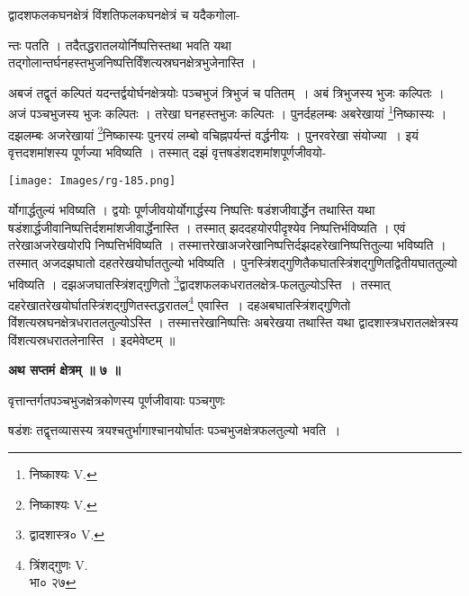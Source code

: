 \documentclass[11pt, openany]{book}
\begin{document}
{\ab द्वादशफलकघनक्षेत्रं विंशतिफलकघनक्षेत्रं च यदैकगोला- }


\newpage
{\ab न्तः पतति । तदैतद्धरातलयोर्निष्पत्तिस्तथा भवति यथा तद्गोलान्तर्घनहस्तभुजनिष्पत्तिर्विंशत्यस्रघनक्षेत्रभुजेनास्ति । }\\
\vspace{5mm}


अबजं तद्वृतं कल्पितं यदन्तर्द्वयोर्घनक्षेत्रयोः पञ्चभुजं त्रिभुजं च पतितम्~। अबं त्रिभुजस्य भुजः कल्पितः । अजं पञ्चभुजस्य भुजः कल्पितः । तरेखा घनहस्तभुजः कल्पितः । पुनर्दहलम्बः अबरेखायां \renewcommand{\thefootnote}{१}\footnote{निष्काश्यः {\en V.}}निष्कास्यः । दझलम्बः अजरेखायां \renewcommand{\thefootnote}{२}\footnote{निष्काश्यः {\en V.}}निष्कास्यः पुनरयं लम्बो वचिह्नपर्यन्तं वर्द्धनीयः । पुनरवरेखा संयोज्या~। इयं वृत्तदशमांशस्य पूर्णज्या भविष्यति । तस्मात् दझं वृत्तषडंशदशमांशपूर्णजीवयो-
\begin{center}
\texttt{[image: Images/rg-185.png]}  
\end{center}
र्योगार्द्धतुल्यं भविष्यति । द्वयोः पूर्णजीवयोर्योगार्द्धस्य निष्पत्तिः षडंशजीवार्द्धेन तथास्ति यथा षडंशार्द्धजीवानिष्पत्तिर्दशमांशजीवार्द्धेनास्ति । तस्मात्
झददहयोरपीदृश्येव निष्पत्तिर्भविष्यति । एवं तरेखाअजरेखयोरपि निष्पत्तिर्भविष्यति । तस्मात्तरेखाअजरेखानिष्पत्तिर्दझदहरेखानिष्पत्तितुल्या भविष्यति । तस्मात् अजदझघातो दहतरेखयोर्घाततुल्यो भविष्यति । पुनस्त्रिंशद्गुणितैकघातस्त्रिंशद्गुणितद्वितीयघाततुल्यो
भविष्यति । दझअजघातस्त्रिंशद्गुणितो \renewcommand{\thefootnote}{३}\footnote{द्वादशास्त्र० {\en V.}}द्वादशफलकधरातलक्षेत्र-फलतुल्योऽस्ति~। तस्मात् दहरेखातरेखयोर्घातस्त्रिंशद्गुणितस्तद्धरातल\renewcommand{\thefootnote}{४}\footnote{त्रिंशद्गुणः {\en V.}\\
भा० २७} एवास्ति~। दहअबघातस्त्रिंशद्गुणितो विंशत्यस्रघनक्षेत्रधरातलतुल्योऽस्ति । तस्मात्तरेखानिष्पत्तिः अबरेखया तथास्ति यथा
द्वादशास्त्रधरातलक्षेत्रस्य विंशत्यस्रधरातलेनास्ति । इदमेवेष्टम् ॥\\
\begin{center}
\textbf{\large अथ सप्तमं क्षेत्रम् ॥ ७ ॥ }
\end{center}
\vspace{5mm}

{\ab वृत्तान्तर्गतपञ्चभुजक्षेत्रकोणस्य पूर्णजीवायाः पञ्चगुणः}

\newpage  

{\ab षडंशः तद्वृत्तव्यासस्य त्रयश्चतुर्भागाश्चानयोर्घातः पञ्चभुजक्षेत्रफलतुल्यो भवति~। }\\
\vspace{3mm}
\end{document}
